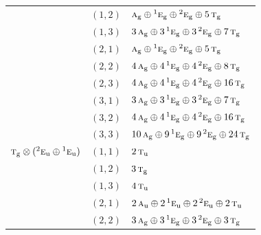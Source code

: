 \documentclass[11pt]{article}
\newcommand{\irr}[1]{\text{\normalfont\scshape #1}}
\newcommand{\conjpair}[1]{{}^{#1}}
\newcommand{\ptag}[1]{\mathrm{#1}}
\begin{document}
\begin{longtable}{p{} c p{}}
 & $(1,2)$ & $\irr{a}_{\ptag{g}}\oplus \conjpair{1}\irr{e}_{\ptag{g}}\oplus \conjpair{2}\irr{e}_{\ptag{g}}\oplus 5\,\irr{t}_{\ptag{g}}$\\

 & $(1,3)$ & $3\,\irr{a}_{\ptag{g}}\oplus 3\,\conjpair{1}\irr{e}_{\ptag{g}}\oplus 3\,\conjpair{2}\irr{e}_{\ptag{g}}\oplus 7\,\irr{t}_{\ptag{g}}$\\

 & $(2,1)$ & $\irr{a}_{\ptag{g}}\oplus \conjpair{1}\irr{e}_{\ptag{g}}\oplus \conjpair{2}\irr{e}_{\ptag{g}}\oplus 5\,\irr{t}_{\ptag{g}}$\\

 & $(2,2)$ & $4\,\irr{a}_{\ptag{g}}\oplus 4\,\conjpair{1}\irr{e}_{\ptag{g}}\oplus 4\,\conjpair{2}\irr{e}_{\ptag{g}}\oplus 8\,\irr{t}_{\ptag{g}}$\\

 & $(2,3)$ & $4\,\irr{a}_{\ptag{g}}\oplus 4\,\conjpair{1}\irr{e}_{\ptag{g}}\oplus 4\,\conjpair{2}\irr{e}_{\ptag{g}}\oplus 16\,\irr{t}_{\ptag{g}}$\\

 & $(3,1)$ & $3\,\irr{a}_{\ptag{g}}\oplus 3\,\conjpair{1}\irr{e}_{\ptag{g}}\oplus 3\,\conjpair{2}\irr{e}_{\ptag{g}}\oplus 7\,\irr{t}_{\ptag{g}}$\\

 & $(3,2)$ & $4\,\irr{a}_{\ptag{g}}\oplus 4\,\conjpair{1}\irr{e}_{\ptag{g}}\oplus 4\,\conjpair{2}\irr{e}_{\ptag{g}}\oplus 16\,\irr{t}_{\ptag{g}}$\\

 & $(3,3)$ & $10\,\irr{a}_{\ptag{g}}\oplus 9\,\conjpair{1}\irr{e}_{\ptag{g}}\oplus 9\,\conjpair{2}\irr{e}_{\ptag{g}}\oplus 24\,\irr{t}_{\ptag{g}}$\\

\hline

$\irr{t}_{\ptag{g}}\otimes (\conjpair{2}\irr{e}_{\ptag{u}}\oplus \conjpair{1}\irr{e}_{\ptag{u}})$ & $(1,1)$ & $2\,\irr{t}_{\ptag{u}}$\\

 & $(1,2)$ & $3\,\irr{t}_{\ptag{g}}$\\

 & $(1,3)$ & $4\,\irr{t}_{\ptag{u}}$\\

 & $(2,1)$ & $2\,\irr{a}_{\ptag{u}}\oplus 2\,\conjpair{1}\irr{e}_{\ptag{u}}\oplus 2\,\conjpair{2}\irr{e}_{\ptag{u}}\oplus 2\,\irr{t}_{\ptag{u}}$\\

 & $(2,2)$ & $3\,\irr{a}_{\ptag{g}}\oplus 3\,\conjpair{1}\irr{e}_{\ptag{g}}\oplus 3\,\conjpair{2}\irr{e}_{\ptag{g}}\oplus 3\,\irr{t}_{\ptag{g}}$\\


\end{longtable}
\end{document}
